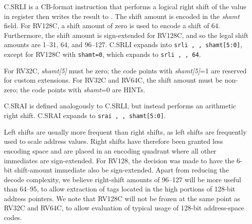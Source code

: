 C.SRLI is a CB-format instruction that performs a logical right shift
of the value in register {\em \rdprime} then writes the result to {\em \rdprime}.
The shift amount is encoded in the {\em shamt} field.
For RV128C, a shift amount of zero is used to encode a shift of 64.
Furthermore, the shift amount is sign-extended
for RV128C, and so the legal shift amounts are 1--31, 64, and 96--127.
C.SRLI expands into {\tt srli \rdprime, \rdprime, shamt[5:0]},
except for RV128C with {\tt shamt=0}, which expands to
{\tt srli \rdprime, \rdprime, 64}.

For RV32C, {\em shamt[5]} must be zero; the code points with {\em shamt[5]}=1
are reserved for custom extensions.  For RV32C and RV64C, the shift
amount must be non-zero; the code points with {\em shamt}=0 are HINTs.

C.SRAI is defined analogously to C.SRLI, but instead performs an arithmetic
right shift.
C.SRAI expands to {\tt srai \rdprime, \rdprime, shamt[5:0]}.

\begin{commentary}
Left shifts are usually more frequent than right shifts, as left
shifts are frequently used to scale address values.  Right shifts have
therefore been granted less encoding space and are placed in an
encoding quadrant where all other immediates are sign-extended.  For
RV128, the decision was made to have the 6-bit shift-amount immediate
also be sign-extended.  Apart from reducing the decode complexity, we
believe right-shift amounts of 96--127 will be more useful than 64--95,
to allow extraction of tags located in the high portions of 128-bit
address pointers.  We note that RV128C will not be frozen at the same
point as RV32C and RV64C, to allow evaluation of typical usage of
128-bit address-space codes.
\end{commentary}

